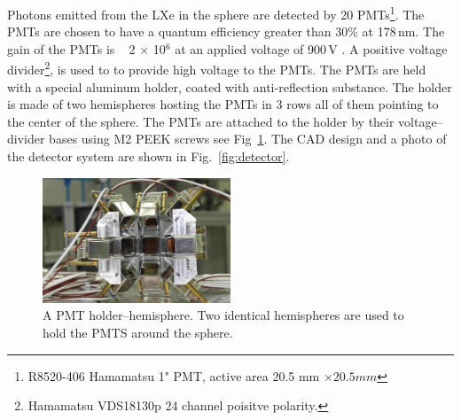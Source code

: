 Photons emitted from the LXe in the sphere are detected by 20  PMTs\footnote{R8520-406 Hamamatsu 1" PMT, active area 20.5 mm $\times 20.5 mm$}. 
The PMTs are chosen to have a quantum efficiency greater than 30\% at 178\,nm. The gain of the PMTs is ~ 2 $\times$ 10$^6$ at an applied voltage of 900\,V . A positive voltage divider\footnote{Hamamatsu VDS18130p 24 channel poisitve polarity.}, is used to to provide high voltage to the PMTs. 
The PMTs are held with a special aluminum holder, coated with anti-reflection substance. 
The holder is made of two hemispheres hosting the PMTs in 3 rows all of them pointing to the 
center of the sphere. The PMTs are attached to the holder by their voltage--divider bases using M2 PEEK screws see Fig~\ref{fig:pmtholder}. 
The CAD design and a photo of the detector system are shown 
in Fig.~\ref{fig:detector}.

\begin{figure}[h]
   \centering
   \includegraphics[width=0.5\textwidth]{PMTholder.JPG}
   \caption{A PMT holder--hemisphere. Two identical hemispheres are used to hold the PMTS around the sphere.} 
   \label{fig:pmtholder}
\end{figure}

